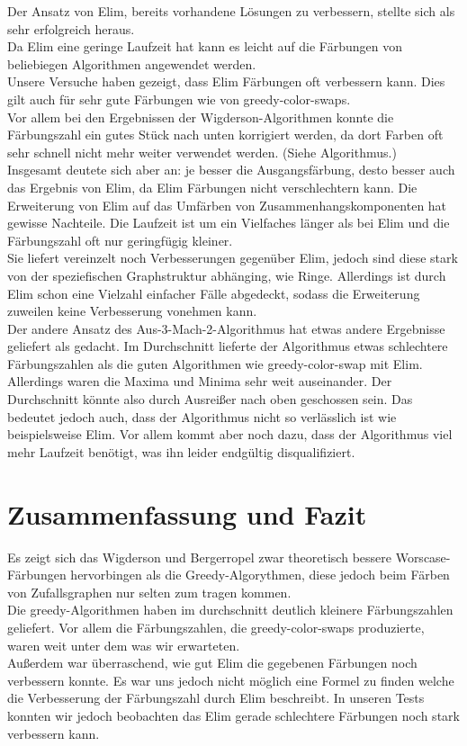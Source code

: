 \documentclass[11pt]{article}
\begin{document}
Der Ansatz von Elim, bereits vorhandene Lösungen zu verbessern, stellte sich als sehr erfolgreich heraus.  \\
Da Elim eine geringe Laufzeit hat kann es leicht auf die Färbungen von beliebiegen Algorithmen angewendet werden. \\
Unsere Versuche haben gezeigt, dass Elim Färbungen oft verbessern kann. Dies gilt auch für sehr gute Färbungen wie von greedy-color-swaps.\\
Vor allem bei den Ergebnissen der Wigderson-Algorithmen konnte die Färbungszahl ein gutes Stück nach unten korrigiert werden, da dort Farben oft sehr schnell nicht mehr weiter verwendet werden. (Siehe Algorithmus.) \\
Insgesamt deutete sich aber an: je besser die Ausgangsfärbung, desto besser auch das Ergebnis von Elim, da Elim Färbungen nicht verschlechtern kann. 
Die Erweiterung von Elim auf das Umfärben von Zusammenhangskomponenten hat gewisse Nachteile. Die Laufzeit ist um ein Vielfaches länger als bei Elim und die Färbungszahl oft nur geringfügig kleiner. \\ %
Sie liefert vereinzelt noch Verbesserungen gegenüber Elim, jedoch sind diese stark von der speziefischen Graphstruktur abhänging, wie Ringe. Allerdings ist durch Elim schon eine Vielzahl einfacher Fälle abgedeckt, sodass die Erweiterung zuweilen keine Verbesserung vonehmen kann. \\
Der andere Ansatz des Aus-3-Mach-2-Algorithmus hat etwas andere Ergebnisse geliefert als gedacht. Im Durchschnitt lieferte der Algorithmus etwas schlechtere Färbungszahlen als die guten Algorithmen wie greedy-color-swap mit Elim.
Allerdings waren die Maxima und Minima sehr weit auseinander. Der Durchschnitt könnte also durch Ausreißer nach oben geschossen sein. 
Das bedeutet jedoch auch, dass der Algorithmus nicht so verlässlich ist wie beispielsweise Elim. Vor allem kommt aber noch dazu, dass der Algorithmus viel mehr Laufzeit benötigt, was ihn leider endgültig disqualifiziert. \\

\section{Zusammenfassung und Fazit} %

Es zeigt sich das Wigderson und Bergerropel zwar theoretisch bessere Worscase-Färbungen hervorbingen als die Greedy-Algorythmen, diese jedoch beim Färben von Zufallsgraphen nur selten zum tragen kommen. \\
Die greedy-Algorithmen haben im durchschnitt deutlich kleinere Färbungszahlen geliefert. Vor allem die Färbungszahlen, die greedy-color-swaps produzierte, waren weit unter dem was wir erwarteten. \\
Außerdem war überraschend, wie gut Elim die gegebenen Färbungen noch verbessern konnte. Es war uns jedoch nicht möglich eine Formel zu finden welche die Verbesserung der Färbungszahl durch Elim beschreibt. In unseren Tests konnten wir jedoch beobachten das Elim gerade schlechtere Färbungen noch stark verbessern kann. \\
\end{document}

